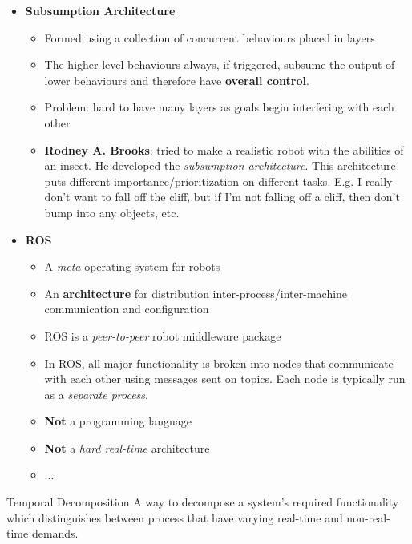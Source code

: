 \documentclass[13pt]{article}
\begin{document}
\begin{itemize}
\begin{itemize}
\begin{itemize}
			\item Solving different problems take different amount of time
		\end{itemize}
		\item One kind of decomposition is \textbf{temporal decomposition} (see below)
	\end{itemize}
	\item \textbf{Subsumption Architecture}
	\begin{itemize}
		\item Formed using a collection of concurrent behaviours placed in layers
		\item The higher-level behaviours always, if triggered, subsume the output of lower behaviours and therefore
		have \textbf{overall control}.
		\item Problem: hard to have many layers as goals begin interfering with each other
		\item \textbf{Rodney A. Brooks}: tried to make a realistic robot with the abilities of an insect. He developed the \textit{subsumption
architecture}. This architecture puts different importance/prioritization on different tasks. E.g. I really don't want
to fall off the cliff, but if I'm not falling off a cliff, then don't bump into any objects, etc.
	\end{itemize}
	\item \textbf{ROS}
	\begin{itemize}
		\item A \textit{meta} operating system for robots
		\item An \textbf{architecture} for distribution inter-process/inter-machine communication and configuration
		\item ROS is a \textit{peer-to-peer} robot middleware package
		\item In ROS, all major functionality is broken into nodes that communicate with each other using messages sent
			on topics. Each node is typically run as a \textit{separate process}.
		\item \textbf{Not} a programming language
		\item \textbf{Not} a \textit{hard real-time} architecture
		\item ...
	\end{itemize}
\end{itemize}

\begin{defn}{Temporal Decomposition}
	A way to decompose a system's required functionality which distinguishes between process that have varying real-time
	and non-real-time demands.
\end{defn}
\end{document}
